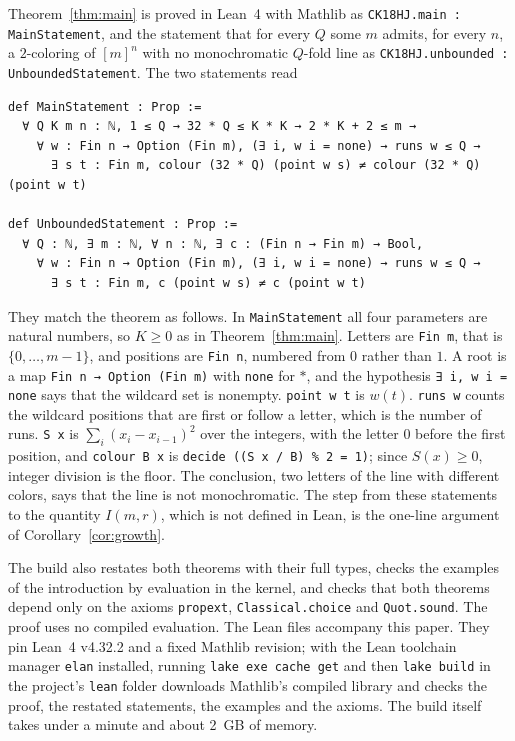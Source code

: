 \documentclass[11pt]{article}
\theoremstyle{remark}
\begin{document}
Theorem~\ref{thm:main} is proved in Lean~4 with Mathlib as \texttt{CK18HJ.main : MainStatement}, and the statement that for every $Q$ some $m$ admits, for every $n$, a $2$-coloring of $[m]^n$ with no monochromatic $Q$-fold line as \texttt{CK18HJ.unbounded : UnboundedStatement}. The two statements read
\begin{verbatim}
def MainStatement : Prop :=
  ∀ Q K m n : ℕ, 1 ≤ Q → 32 * Q ≤ K * K → 2 * K + 2 ≤ m →
    ∀ w : Fin n → Option (Fin m), (∃ i, w i = none) → runs w ≤ Q →
      ∃ s t : Fin m, colour (32 * Q) (point w s) ≠ colour (32 * Q) (point w t)

def UnboundedStatement : Prop :=
  ∀ Q : ℕ, ∃ m : ℕ, ∀ n : ℕ, ∃ c : (Fin n → Fin m) → Bool,
    ∀ w : Fin n → Option (Fin m), (∃ i, w i = none) → runs w ≤ Q →
      ∃ s t : Fin m, c (point w s) ≠ c (point w t)
\end{verbatim}
They match the theorem as follows. In \texttt{MainStatement} all four parameters are natural numbers, so $K\ge0$ as in Theorem~\ref{thm:main}. Letters are \texttt{Fin m}, that is $\{0,\ldots,m-1\}$, and positions are \texttt{Fin n}, numbered from $0$ rather than $1$. A root is a map \texttt{Fin n → Option (Fin m)} with \texttt{none} for $*$, and the hypothesis \texttt{∃ i, w i = none} says that the wildcard set is nonempty. \texttt{point w t} is $w(t)$. \texttt{runs w} counts the wildcard positions that are first or follow a letter, which is the number of runs. \texttt{S x} is $\sum_i(x_i-x_{i-1})^2$ over the integers, with the letter $0$ before the first position, and \texttt{colour B x} is \texttt{decide ((S x / B) \% 2 = 1)}; since $S(x)\ge0$, integer division is the floor. The conclusion, two letters of the line with different colors, says that the line is not monochromatic. The step from these statements to the quantity $I(m,r)$, which is not defined in Lean, is the one-line argument of Corollary~\ref{cor:growth}.

The build also restates both theorems with their full types, checks the examples of the introduction by evaluation in the kernel, and checks that both theorems depend only on the axioms \texttt{propext}, \texttt{Classical.choice} and \texttt{Quot.sound}. The proof uses no compiled evaluation. The Lean files accompany this paper. They pin Lean~4 v4.32.2 and a fixed Mathlib revision; with the Lean toolchain manager \texttt{elan} installed, running \texttt{lake exe cache get} and then \texttt{lake build} in the project's \texttt{lean} folder downloads Mathlib's compiled library and checks the proof, the restated statements, the examples and the axioms. The build itself takes under a minute and about 2~GB of memory.
\end{document}
